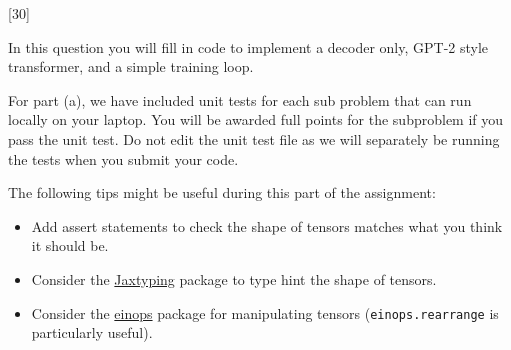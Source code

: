 \graphicspath{ {images/} }

\newcommand{\Real}{\mathbb{R}}
\newcommand{\Int}{\mathbb{Z}}
\renewcommand\Re{\ensuremath{\text{Re}}} %


\newcommand{\henc}{\bh^{\text{enc}}}
\newcommand{\hencfw}[1]{\overrightarrow{\henc_{#1}}}
\newcommand{\hencbw}[1]{\overleftarrow{\henc_{#1}}}

\newcommand{\cenc}{\bc^{\text{enc}}}
\newcommand{\cencfw}[1]{\overrightarrow{\cenc_{#1}}}
\newcommand{\cencbw}[1]{\overleftarrow{\cenc_{#1}}}

\newcommand{\hdec}{\bh^{\text{dec}}}

\newcommand{\cdec}{\bc^{\text{dec}}}

\newcommand{\LB}[1]{\textcolor{red}{[LB: #1]}}
\newcommand{\THa}[1]{\textcolor{blue}{[TH: #1]}}
\newcommand{\DY}[1]{\textcolor{green}{[DY: #1}}

\lstset{basicstyle=\ttfamily,columns=flexible,numbers=none}

[30]
\label{sec:char_enc}

In this question you will fill in code to implement a decoder only, GPT-2 style transformer, and 
a simple training loop. 

For part (a), we have included unit tests for each sub problem that can run locally on your laptop.
You will be awarded full points for the subproblem if you pass the unit test. Do not edit the unit test 
file as we will separately be running the tests when you submit your code. 

The following tips might be useful during this part of the assignment:

\begin{itemize}
    \item Add assert statements to check the shape of tensors matches what you think it should be.
    \item Consider the \href{https://docs.kidger.site/jaxtyping/}{Jaxtyping} package to type hint the shape of tensors.
    \item Consider the \href{https://einops.rocks/}{einops} package for manipulating tensors (\texttt{einops.rearrange} is 
    particularly useful).
\end{itemize}

